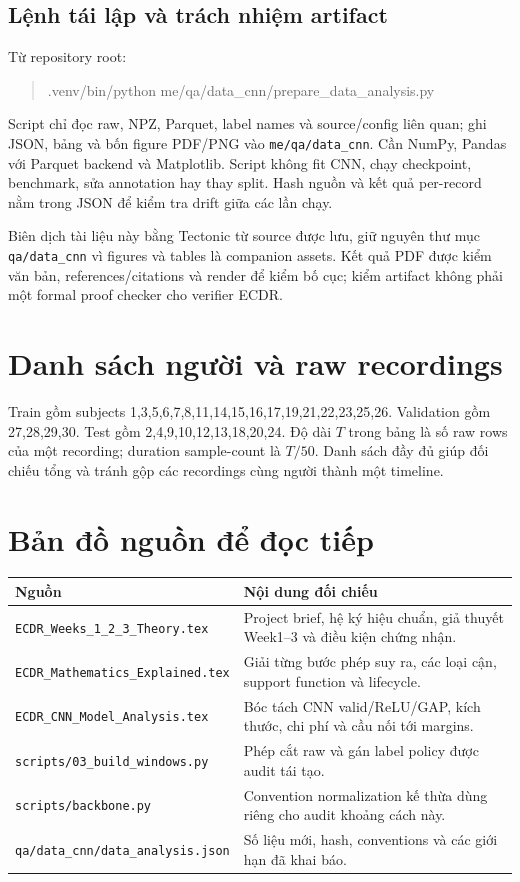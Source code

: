 \documentclass[11pt,a4paper]{article}
\newcommand{\code}[1]{{\small\ttfamily\nolinkurl{#1}}}
\theoremstyle{definition}
\begin{document}
\subsection{Lệnh tái lập và trách nhiệm artifact}
Từ repository root:
\begin{quote}\small\ttfamily
.venv/bin/python me/qa/data\_cnn/prepare\_data\_analysis.py
\end{quote}
Script chỉ đọc raw, NPZ, Parquet, label names và source/config liên quan;
ghi JSON, bảng và bốn figure PDF/PNG vào \code{me/qa/data_cnn}. Cần NumPy,
Pandas với Parquet backend và Matplotlib. Script không fit CNN, chạy
checkpoint, benchmark, sửa annotation hay thay split. Hash nguồn và kết
quả per-record nằm trong JSON để kiểm tra drift giữa các lần chạy.

Biên dịch tài liệu này bằng Tectonic từ source được lưu, giữ nguyên thư
mục \code{qa/data_cnn} vì figures và tables là companion assets. Kết quả
PDF được kiểm văn bản, references/citations và render để kiểm bố cục;
kiểm artifact không phải một formal proof checker cho verifier ECDR.

\appendix
\clearpage
\section{Danh sách người và raw recordings}\label{app:subjects}
Train gồm subjects 1,3,5,6,7,8,11,14,15,16,17,19,21,22,23,25,26.
Validation gồm 27,28,29,30. Test gồm 2,4,9,10,12,13,18,20,24.
Độ dài $T$ trong bảng là số raw rows của một recording; duration sample-count
là $T/50$. Danh sách đầy đủ giúp đối chiếu tổng và tránh gộp các recordings
cùng người thành một timeline.



\section{Bản đồ nguồn để đọc tiếp}
\begin{tabularx}{\linewidth}{@{}P{4.0cm}Y@{}}\toprule
Nguồn & Nội dung đối chiếu\\\midrule
\code{ECDR_Weeks_1_2_3_Theory.tex} & Project brief, hệ ký hiệu chuẩn, giả thuyết Week1--3 và điều kiện chứng nhận.\\
\code{ECDR_Mathematics_Explained.tex} & Giải từng bước phép suy ra, các loại cận, support function và lifecycle.\\
\code{ECDR_CNN_Model_Analysis.tex} & Bóc tách CNN valid/ReLU/GAP, kích thước, chi phí và cầu nối tới margins.\\
\code{scripts/03_build_windows.py} & Phép cắt raw và gán label policy được audit tái tạo.\\
\code{scripts/backbone.py} & Convention normalization kế thừa dùng riêng cho audit khoảng cách này.\\
\code{qa/data_cnn/data_analysis.json} & Số liệu mới, hash, conventions và các giới hạn đã khai báo.\\\bottomrule
\end{tabularx}
\end{document}
